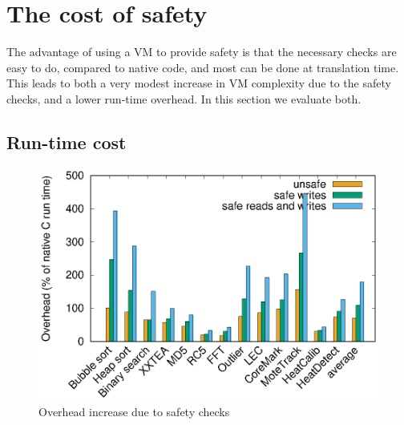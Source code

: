 

\section{The cost of safety}
\label{sec-evaluation-safety}

The advantage of using a VM to provide safety is that the necessary checks are easy to do, compared to native code, and most can be done at translation time. This leads to both a very modest increase in VM complexity due to the safety checks, and a lower run-time overhead. In this section we evaluate both.


\subsection{Run-time cost}
\label{sec-evaluation-run-time-cost}

\begin{figure}
\centering
\includegraphics[width=\mygraphsize]{safety-cost.eps}
\caption{Overhead increase due to safety checks}
\label{fig-safety-cost-per-benchmark}
\end{figure}

